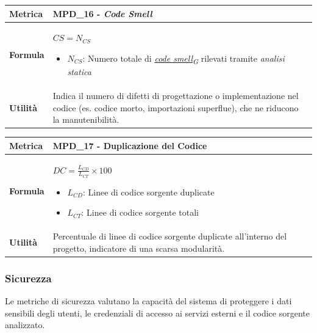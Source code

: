 \documentclass[12pt, a4paper]{article}
\newcommand{\urlglossario}{https://skynetunigroup.github.io/Code_Guardian/Documentazione/RTB/glossario_v1.0.0.pdf} %
\newcommand{\glo}[2]{\href{\urlglossario\#nameddest=#2}{#1\textsubscript{G}}}
\begin{document}
\begin{table}[H]
\centering
\renewcommand{\arraystretch}{1.5}
\begin{tabular}{|l|p{12cm}|}
\hline
\textbf{Metrica} & MPD\_16 - \textit{Code Smell} \\ \hline
\textbf{Formula} & $CS = N_{CS}$
\begin{itemize}
    \item $N_{CS}$: Numero totale di \textit{\glo{code smell}{code-smell}} rilevati tramite \textit{analisi statica}
\end{itemize} \\ \hline
\textbf{Utilità} & Indica il numero di difetti di progettazione o implementazione nel codice (es. codice morto, importazioni superflue), che ne riducono la manutenibilità. \\ \hline
\end{tabular}
\end{table}

\begin{table}[H]
\centering
\renewcommand{\arraystretch}{1.5}
\begin{tabular}{|l|p{12cm}|}
\hline
\textbf{Metrica} & MPD\_17 - Duplicazione del Codice \\ \hline
\textbf{Formula} & $DC = \frac{L_{CD}}{L_{CT}} \times 100$
\begin{itemize}
    \item $L_{CD}$: Linee di codice sorgente duplicate
    \item $L_{CT}$: Linee di codice sorgente totali
\end{itemize} \\ \hline
\textbf{Utilità} & Percentuale di linee di codice sorgente duplicate all'interno del progetto, indicatore di una scarsa modularità. \\ \hline
\end{tabular}
\end{table}


\subsubsection{Sicurezza}
Le metriche di sicurezza valutano la capacità del sistema di proteggere i dati sensibili degli utenti, le credenziali di accesso ai servizi esterni e il codice sorgente analizzato.
\end{document}
